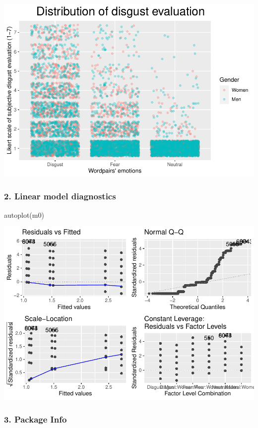 \documentclass[
]{article}
\newenvironment{Shaded}{\begin{snugshade}}{\end{snugshade}}
\newcommand{\FunctionTok}[1]{\textcolor[rgb]{0.00,0.00,0.00}{#1}}
\newcommand{\NormalTok}[1]{#1}
\begin{document}
\includegraphics{DAP_v4-1-22_files/figure-latex/alternate graph-1.pdf}

\hypertarget{linear-model-diagnostics}{%
\subsubsection{2. Linear model
diagnostics}\label{linear-model-diagnostics}}

\begin{Shaded}
\begin{Highlighting}[]
\FunctionTok{autoplot}\NormalTok{(m0)}
\end{Highlighting}
\end{Shaded}

\includegraphics{DAP_v4-1-22_files/figure-latex/unnamed-chunk-12-1.pdf}

\hypertarget{package-info}{%
\subsubsection{3. Package Info}\label{package-info}}
\end{document}
